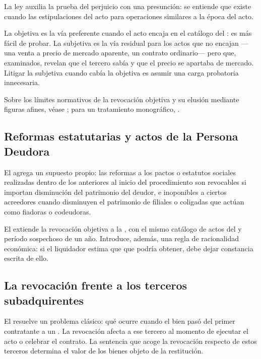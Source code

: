 La ley auxilia la prueba del perjuicio con una presunción: se entiende que existe cuando las
estipulaciones del acto  para
operaciones similares a la época del acto.

\begin{foco}
La objetiva es la vía preferente cuando el acto encaja en el catálogo del : es más
fácil de probar. La subjetiva es la vía residual para los actos que no encajan ---una venta a
precio de mercado aparente, un contrato ordinario--- pero que, examinados, revelan que el
tercero sabía y que el precio se apartaba de mercado. Litigar la subjetiva cuando cabía la
objetiva es asumir una carga probatoria innecesaria.
\end{foco}

Sobre los límites normativos de la revocación objetiva y su elusión mediante figuras afines,
véase \textcite{doc-revocacion-objetiva}; para un tratamiento monográfico,
\textcite{doc-acciones-revocatorias}.

\subsection{Reformas estatutarias y actos de la Persona Deudora}

El  agrega un supuesto propio: las reformas a los pactos o estatutos sociales
realizadas dentro de los  anteriores al inicio del procedimiento son
revocables si importan disminución del patrimonio del deudor, e inoponibles a ciertos
acreedores cuando disminuyen el patrimonio de filiales o coligadas que actúan como fiadoras o
codeudoras.

El  extiende la revocación objetiva a la \personadeudora{}, con el mismo catálogo de
actos del  y período sospechoso de un año. Introduce, además, una regla de
racionalidad económica: si el liquidador estima que  que podría obtener, debe dejar constancia escrita de ello.

\subsection{La revocación frente a los terceros subadquirentes}

El  resuelve un problema clásico: qué ocurre cuando el bien pasó del primer contratante
a un . La revocación afecta a ese tercero  al momento de ejecutar el acto o celebrar el
contrato. La sentencia que acoge la revocación respecto de estos terceros determina el valor de
los bienes objeto de la restitución.

